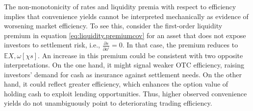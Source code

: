 \documentclass[12pt,american,english,notitlepage]{article}
\begin{document}
The non-monotonicity of rates and liquidity premia with respect to efficiency implies that convenience yields cannot be interpreted mechanically as evidence of worsening market efficiency. To see this, consider the first-order liquidity premium in equation \eqref{eq:liquidity.premiumcov} for an asset that does not expose investors to settlement risk, i.e., $\frac{\partial s}{\partial a^{i}}=0$. In that case, the premium reduces to $\mathbb{E}{X,\omega}\left[\chi{s} \right]$. An increase in this premium could be consistent with two opposite interpretations. On the one hand, it might signal weaker OTC efficiency, raising investors’ demand for cash as insurance against settlement needs. On the other hand, it could reflect greater efficiency, which enhances the option value of holding cash to exploit lending opportunities. Thus, higher observed convenience yields do not unambiguously point to deteriorating trading efficiency.
\end{document}

